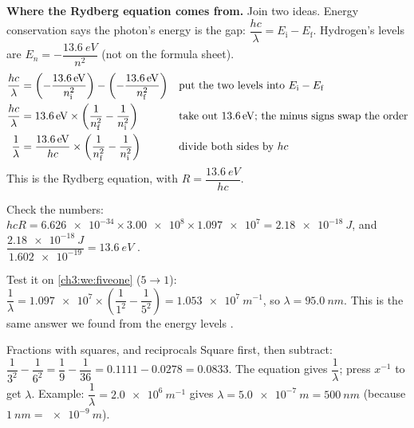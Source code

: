 \textbf{Where the Rydberg equation comes from.} Join two ideas. Energy conservation says the
photon's energy is the gap: $\dfrac{hc}{\lambda} = E_\mathrm{i} - E_\mathrm{f}$. Hydrogen's
levels are $E_n = -\dfrac{\qty{13.6}{eV}}{n^2}$ (not on the formula sheet).
\begin{align*}
  \frac{hc}{\lambda} &= \left(-\frac{\qty{13.6}{eV}}{n_\mathrm{i}^2}\right)
    - \left(-\frac{\qty{13.6}{eV}}{n_\mathrm{f}^2}\right)
    && \text{put the two levels into $E_\mathrm{i} - E_\mathrm{f}$}\\
  \frac{hc}{\lambda} &= \qty{13.6}{eV} \times \left(\frac{1}{n_\mathrm{f}^2}
    - \frac{1}{n_\mathrm{i}^2}\right) && \text{take out \qty{13.6}{eV}; the minus signs swap
    the order}\\
  \frac{1}{\lambda} &= \frac{\qty{13.6}{eV}}{hc} \times \left(\frac{1}{n_\mathrm{f}^2}
    - \frac{1}{n_\mathrm{i}^2}\right) && \text{divide both sides by $hc$}
\end{align*}
This is the Rydberg equation, with $R = \dfrac{\qty{13.6}{eV}}{hc}$.

Check the numbers: $hcR = \num{6.626e-34} \times \num{3.00e8} \times \num{1.097e7} =
\qty{2.18e-18}{J}$, and $\dfrac{\qty{2.18e-18}{J}}{\num{1.602e-19}} = \qty{13.6}{eV}$ \cmark.

Test it on \cref{ch3:we:fiveone} ($5 \to 1$): $\dfrac{1}{\lambda} = \num{1.097e7} \times
\left(\dfrac{1}{1^2} - \dfrac{1}{5^2}\right) = \qty{1.053e7}{m^{-1}}$, so $\lambda =
\qty{95.0}{nm}$. This is the same answer we found from the energy levels \cmark.

\begin{toolkit}{Fractions with squares, and reciprocals}
Square first, then subtract: $\dfrac{1}{3^2} - \dfrac{1}{6^2} = \dfrac19 - \dfrac{1}{36} =
0.1111 - 0.0278 = 0.0833$. The equation gives $\dfrac{1}{\lambda}$; press $x^{-1}$ to get
$\lambda$. Example: $\dfrac{1}{\lambda} = \qty{2.0e6}{m^{-1}}$ gives $\lambda =
\qty{5.0e-7}{m} = \qty{500}{nm}$ (because $\qty{1}{nm} = \qty{e-9}{m}$).
\end{toolkit}

